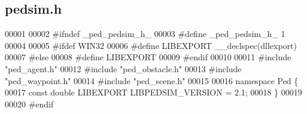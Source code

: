 \hypertarget{pedsim_8h_source}{
\subsection{pedsim.h}
}

\begin{DoxyCode}
00001 
00002 \textcolor{preprocessor}{#ifndef \_ped\_pedsim\_h\_}
00003 \textcolor{preprocessor}{}\textcolor{preprocessor}{#define \_ped\_pedsim\_h\_ 1}
00004 \textcolor{preprocessor}{}
00005 \textcolor{preprocessor}{#ifdef WIN32}
00006 \textcolor{preprocessor}{}\textcolor{preprocessor}{#define LIBEXPORT \_\_declspec(dllexport)}
00007 \textcolor{preprocessor}{}\textcolor{preprocessor}{#else}
00008 \textcolor{preprocessor}{}\textcolor{preprocessor}{#define LIBEXPORT}
00009 \textcolor{preprocessor}{}\textcolor{preprocessor}{#endif}
00010 \textcolor{preprocessor}{}
00011 \textcolor{preprocessor}{#include "ped\_agent.h"}
00012 \textcolor{preprocessor}{#include "ped\_obstacle.h"}
00013 \textcolor{preprocessor}{#include "ped\_waypoint.h"}
00014 \textcolor{preprocessor}{#include "ped\_scene.h"}
00015 
00016 \textcolor{keyword}{namespace }Ped \{
00017         \textcolor{keyword}{const} \textcolor{keywordtype}{double} LIBEXPORT LIBPEDSIM\_VERSION = 2.1;
00018 \}
00019 
00020 \textcolor{preprocessor}{#endif}
\end{DoxyCode}
